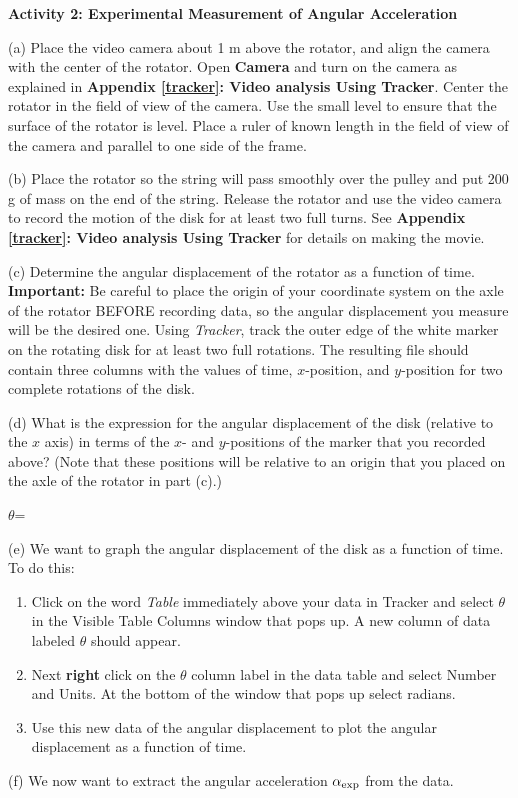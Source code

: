 \textbf{Activity 2: Experimental Measurement of Angular Acceleration} 

(a) Place the video camera about 1 m above the rotator, and align the camera with the 
center of the rotator. Open \textbf{Camera} and turn on the camera as explained in \textbf{Appendix \ref{tracker}: Video analysis Using Tracker}. Center the rotator in the 
field of view of the camera. Use the small level to ensure that the surface of the rotator 
is level. Place a ruler of known length in the field of view of the camera and parallel to 
one side of the frame.

(b) Place the rotator so the string will pass smoothly over the pulley and put
200 g of mass on the end of the string. Release the rotator and use the
video camera to record the motion of the disk for at least two full turns. See  
\textbf{Appendix \ref{tracker}: Video analysis Using Tracker} for details on 
making the movie.

(c) Determine the angular displacement of the rotator as a function of time. \textbf{Important:} Be careful to place the origin of your coordinate system on the axle of the rotator BEFORE recording data, so the angular displacement you measure will be the desired one. Using \textit{Tracker}, track the outer edge of the white marker on the rotating disk for at least two full rotations. The resulting file should contain three columns with the values of time, $x$-position, and $y$-position for two complete rotations of the disk.

\pagebreak[2]
(d) What is the expression for the angular displacement of the disk (relative to the $x$ axis) in terms of the $x$- and $y$-positions of the marker that you recorded above? (Note that these positions will be relative to an origin that you placed on the axle of the rotator in part (c).)
\vspace{5mm}

\hspace{0.5in}\( \theta  \)= 
\answerspace{5mm}

\pagebreak[2]
(e) We want to graph the angular displacement of the disk as a function of time.
To do this:

\begin{enumerate}
\item Click on the word {\it Table} immediately above your data in Tracker and select \( \theta \) in the Visible Table Columns window that pops up.  A new column of data labeled \( \theta \) should appear.

\item Next {\bf right} click on the \( \theta \) column label in the data table and select Number and Units.  At the bottom of the window that pops up select radians. 

\item  Use this new data of the angular displacement to plot the angular displacement as a function of time. 

\end{enumerate}
\pagebreak
(f) We now want to extract the angular acceleration $\alpha _{\rm exp}$ from the data.

